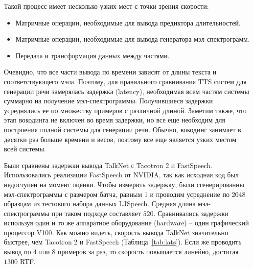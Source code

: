 Такой процесс имеет несколько узких мест с точки зрения скорости:
\begin{itemize}
    \item Матричные операции, необходимые для вывода предиктора длительностей.
    \item Матричные операции, необходимые для вывода генератора мэл-спектрограмм.
    \item Передача и трансформация данных между частями.
\end{itemize}

Очевидно, что все части вывода по времени зависят от длины текста и соответствующего мэла. Поэтому, для правильного сравнивания TTS систем для генерации речи замерялась задержка (latency), необходимая всем частям системы суммарно на получение мэл-спектрограммы. Получившиеся задержки усреднялись ее по множеству примеров с различной длиной. Заметим также, что этап вокодинга не включен во время задержки, но все еще необходим для построения полной системы для генерации речи. Обычно, вокодинг занимает в десятки раз больше времени и весов, поэтому все еще является узких местом всей системы.

Были сравнены задержки вывода TalkNet с Tacotron 2 и FastSpeech. Использовались реализации FastSpeech от NVIDIA, так как исходная код был недоступен на момент оценки. Чтобы измерить задержку, были сгенерированны мэл-спектрограммы с размером батча, равным 1 и проводим усреднение по 2048 образцам из тестового набора данных LJSpeech. Средняя длина мэл-спектрограммы при таком подходе составляет $520$. Сравнивались задержки используя один и то же аппаратное оборудование (hardware) -- один графический процессор V100. Как можно видеть, скорость вывода TalkNet значительно быстрее, чем Tacotron 2 и FastSpeech (Таблица~\ref{tab:lats}). Если же проводить вывод по 4 или 8 примеров за раз, то скорость повышается линейно, достигая $1300$ RTF.

